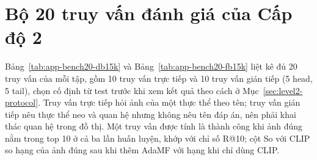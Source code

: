 
\section{Bộ 20 truy vấn đánh giá của Cấp độ 2}
\label{app:bench20}



Bảng~\ref{tab:app-bench20-db15k} và Bảng~\ref{tab:app-bench20-fb15k} liệt kê đủ 20 truy vấn của mỗi tập, gồm 10 truy vấn trực tiếp và 10 truy vấn gián tiếp (5 head, 5 tail), chọn cố định từ test trước khi xem kết quả theo cách ở Mục~\ref{sec:level2-protocol}. Truy vấn trực tiếp hỏi ảnh của một thực thể theo tên; truy vấn gián tiếp nêu thực thể neo và quan hệ nhưng không nêu tên đáp án, nên phải khai thác quan hệ trong đồ thị. Một truy vấn được tính là thành công khi ảnh đúng nằm trong top 10 ở cả ba lần huấn luyện, khớp với chỉ số R@10; cột So với CLIP so hạng của ảnh đúng sau khi thêm AdaMF với hạng khi chỉ dùng CLIP.
